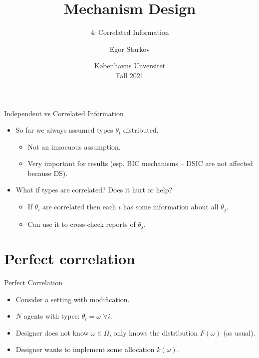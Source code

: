 \documentclass[english,10pt
,aspectratio=169
]{beamer}
\title{Mechanism Design}
\subtitle{4: Correlated Information}
\author{Egor Starkov}
\date{K{\o}benhavns Unversitet \\
	Fall 2021}
\begin{document}
	\frame[plain]{\titlepage}



\begin{frame}{Independent vs Correlated Information}
\begin{itemize}
	\item So far we always assumed types $\theta_i$  distributed.
	\begin{itemize}
		\item Not an innocuous assumption.
		\item Very important for results (esp. BIC mechanisms -- DSIC are not affected because DS).
	\end{itemize}
	\item What if types are \alert{correlated}? Does it hurt or help?
	\begin{itemize}
		\item If $\theta_i$ are correlated then each $i$ has some information about all $\theta_j$.
		\item Can use it to cross-check reports of $\theta_j$.
	\end{itemize}
\end{itemize}
\end{frame}


\section{Perfect correlation}

\begin{frame}{Perfect Correlation}
\begin{itemize}
	\item Consider a  setting with modification.
	\item $N$ agents with  types: $\theta_i = \omega$ $\forall i$.
	\item Designer does not know $\omega \in \Omega$, only knows the distribution $F(\omega)$ (as usual).
	\item Designer wants to implement some allocation $k(\omega)$.
\end{itemize}
\end{frame}
\end{document}
